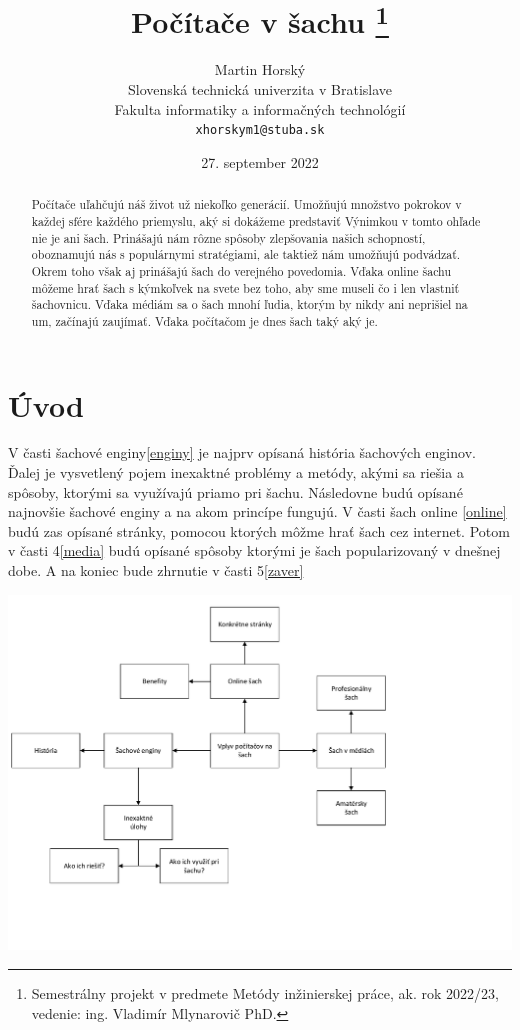 \documentclass[10pt,twoside,slovak,a4paper]{article}
\title{Počítače v šachu \thanks{Semestrálny projekt v predmete Metódy inžinierskej práce, ak. rok 2022/23, vedenie: ing. Vladimír Mlynarovič PhD.}} %
\author{Martin Horský\\[2pt]
	{\small Slovenská technická univerzita v Bratislave}\\
	{\small Fakulta informatiky a informačných technológií}\\
	{\small \texttt{xhorskym1@stuba.sk}}
	}
\date{\small 27. september 2022}
\begin{document}
\maketitle

\begin{abstract}
Počítače uľahčujú náš život už niekoľko generácií. Umožňujú množstvo pokrokov v každej sfére každého priemyslu, aký si dokážeme predstaviť Výnimkou v tomto ohľade nie je ani šach. Prinášajú nám rôzne spôsoby zlepšovania našich schopností, oboznamujú nás s populárnymi stratégiami, ale taktiež nám umožňujú podvádzať. Okrem toho však aj prinášajú šach do verejného povedomia. Vďaka online šachu môžeme hrať šach s kýmkoľvek na svete bez toho, aby sme museli čo i len vlastniť šachovnicu. Vďaka médiám sa o šach mnohí ľudia, ktorým by nikdy ani neprišiel na um, začínajú zaujímať. Vďaka počítačom je dnes šach taký aký je.
\end{abstract}


\section{Úvod}\label{intro}

V časti šachové enginy\ref{enginy} je najprv opísaná história šachových enginov. Ďalej je vysvetlený pojem inexaktné problémy a metódy, akými sa riešia a spôsoby, ktorými sa využívajú priamo pri šachu. Následovne budú opísané najnovšie šachové enginy a na akom princípe fungujú. 
V časti šach online \ref{online} budú zas opísané stránky, pomocou ktorých môžme hrať šach cez internet. Potom v časti 4\ref{media} budú opísané spôsoby ktorými je šach popularizovaný v dnešnej dobe. A na koniec bude zhrnutie v časti 5\ref{zaver}

\includegraphics[scale=0.5]{mindmap}
\end{document}
